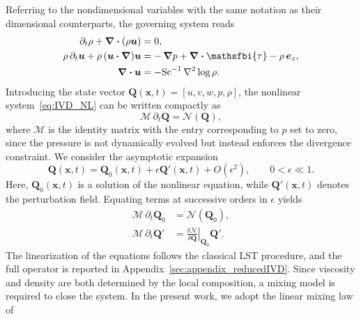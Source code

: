 \documentclass[11pt]{article}
\newcommand{\Sch}{\mathrm{Sc}}
\newcommand{\bnabla}{\boldsymbol{\nabla}}
\newcommand{\bcdot}{\boldsymbol{\cdot}}
\begin{document}
Referring to the nondimensional variables with the same notation as their dimensional counterparts, the governing system reads
\begin{subequations}
    \label{eq:IVD_NL}
    \begin{align}
        \partial_t \rho + \bnabla\bcdot(\rho \boldsymbol{u}) &= 0, \\
        \rho\,\partial_t \boldsymbol{u} + \rho\,(\boldsymbol{u}\bcdot\bnabla)\boldsymbol{u} &= -\,\bnabla p + \bnabla\bcdot\mathsfbi{\tau} - \rho\,\boldsymbol{e}_z, \\
        \bnabla \bcdot \boldsymbol{u} &= -\Sch^{-1}\,\nabla^2 \log\rho.
    \end{align}
\end{subequations}
Introducing the state vector \(\boldsymbol{Q}(\boldsymbol{x},t) = \left[ u, v, w, p, \rho \right]\), the nonlinear system~\eqref{eq:IVD_NL} can be written compactly as
\begin{equation}
    \mathscr{M}\,\partial_t \boldsymbol{Q} = \mathcal{N}\!\left( \boldsymbol{Q} \right),
\end{equation}
where \(\mathscr{M}\) is the identity matrix with the entry corresponding to \(p\) set to zero, since the pressure is not dynamically evolved but instead enforces the divergence constraint.
We consider the asymptotic expansion
\begin{equation}
    \boldsymbol{Q}(\boldsymbol{x},t)
    =
    \boldsymbol{Q}_0(\boldsymbol{x},t)
    +
    \epsilon \boldsymbol{Q}'(\boldsymbol{x},t)
    +
    O(\epsilon^2),
    \qquad 0<\epsilon\ll1 .
\end{equation}
Here, \(\boldsymbol{Q}_0(\boldsymbol{x},t)\) is a solution of the nonlinear equation, while \(\boldsymbol{Q}'(\boldsymbol{x},t)\) denotes the perturbation field. Equating terms at successive orders in \(\epsilon\) yields
\begin{subequations}
    \begin{align}
        \label{eq:compact_0th_equations}
        \mathscr{M}\,\partial_t \boldsymbol{Q}_0
        &=
        \mathcal{N}\!\left( \boldsymbol{Q}_0 \right),
        \\
        \label{eq:compact_1st_equations}
        \mathscr{M}\,\partial_t \boldsymbol{Q}'
        &=
        \left.
        \frac{\delta \mathcal{N}}{\delta \boldsymbol{Q}}
        \right|_{\boldsymbol{Q}_0}
        \boldsymbol{Q}' .
    \end{align}
\end{subequations}
The linearization of the equations follows the classical LST procedure, and the full operator is reported in Appendix~\ref{sec:appendix_reducedIVD}. Since viscosity and density are both determined by the local composition, a mixing model is required to close the system. In the present work, we adopt the linear mixing law of \citet{morgan-likhachev-jacobs-2016}
\end{document}
